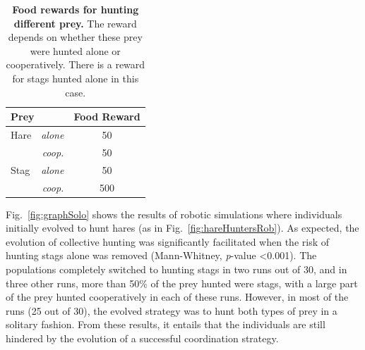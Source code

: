     \begin{table}[ht]
      \centering
        \begin{tabular}{|l|r|c|}
          \hline
          \multicolumn{2}{|l|}{\textbf{Prey}} & \textbf{Food Reward} \\
          \hline
          Hare & \textit{alone} & 50 \\
          \hline
          & \textit{coop.} & 50 \\
          \hline
          Stag & \textit{alone} & 50 \\
          \hline
          & \textit{coop.} & 500 \\
          \hline
        \end{tabular}
        \caption{\textbf{Food rewards for hunting different prey.}
        The reward depends on whether these prey were hunted alone or cooperatively. There is a reward for stags hunted alone in this case.}
      \label{table:tableRewardsStagAlone}
    \end{table}

    Fig.~\ref{fig:graphSolo} shows the results of robotic simulations where individuals initially evolved to hunt hares (as in Fig.~\ref{fig:hareHuntersRob}). As expected, the evolution of collective hunting was significantly facilitated when the risk of hunting stags alone was removed (Mann-Whitney, {\em p}-value \textless 0.001). The populations completely switched to hunting stags in two runs out of 30, and in three other runs, more than 50\% of the prey hunted were stags, with a large part of the prey hunted cooperatively in each of these runs. However, in most of the runs (25 out of 30), the evolved strategy was to hunt both types of prey in a solitary fashion. From these results, it entails that the individuals are still hindered by the evolution of a successful coordination strategy.
    
